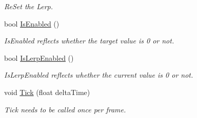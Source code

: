 \begin{DoxyCompactItemize}
\begin{DoxyCompactList}\small\item\em Re\+Set the Lerp. \end{DoxyCompactList}\item 
bool \hyperlink{class_microsoft_1_1_samples_1_1_kinect_1_1_avateering_1_1_filters_1_1_timed_lerp_ab8f4dca739b0f1240a1bde6fa949fcdb}{Is\+Enabled} ()
\begin{DoxyCompactList}\small\item\em Is\+Enabled reflects whether the target value is 0 or not. \end{DoxyCompactList}\item 
bool \hyperlink{class_microsoft_1_1_samples_1_1_kinect_1_1_avateering_1_1_filters_1_1_timed_lerp_afbd26c2a019f4208b1b4fde7c0795a3a}{Is\+Lerp\+Enabled} ()
\begin{DoxyCompactList}\small\item\em Is\+Lerp\+Enabled reflects whether the current value is 0 or not. \end{DoxyCompactList}\item 
void \hyperlink{class_microsoft_1_1_samples_1_1_kinect_1_1_avateering_1_1_filters_1_1_timed_lerp_a253aa6f84dbfc579ba0e89a97bdfb537}{Tick} (float delta\+Time)
\begin{DoxyCompactList}\small\item\em Tick needs to be called once per frame. \end{DoxyCompactList}\end{DoxyCompactItemize}
